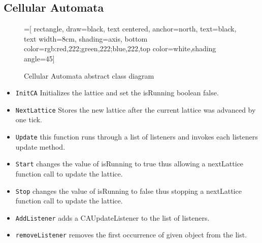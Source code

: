 \documentclass[a4paper, 10pt]{article}
\begin{document}
\subsection{Cellular Automata}
\label{ica}
\begin{figure}[!ht]
\center
{}=[
    rectangle,
    draw=black,
    text centered,
    anchor=north,
    text=black,
    text width=8cm,
    shading=axis,
    bottom color={rgb:red,222;green,222;blue,222},top color=white,shading angle=45]

\caption{Cellular Automata abstract class diagram}
\end{figure}
\begin{itemize}
\item \texttt{InitCA} Initializes the lattice and set the isRunning boolean false.
\item \texttt{NextLattice} Stores the new lattice after the current lattice was advanced by one tick.
\item \texttt{Update} this function runs through a list of listeners and invokes each listeners update method.
\item \texttt{Start} changes the value of isRunning to true thus allowing a nextLattice function call to update the lattice.
\item \texttt{Stop} changes the value of isRunning to false thus stopping a nextLattice  function call to update the lattice.
\item \texttt{AddListener} adds a CAUpdateListener to the list of listeners.
\item \texttt{removeListener} removes the first occurrence of given object from the list.
\end{itemize}
\end{document}

